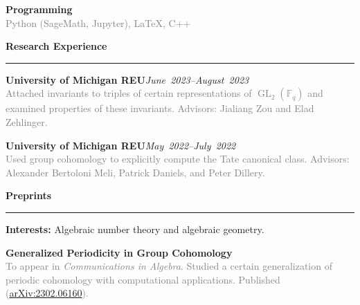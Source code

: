 \documentclass{article}
\renewcommand{\section}[1]{{\color{headercolor}\LARGE
    \textbf{#1\phantom{p}}\hrule}}
\newcommand{\entry}[5]{{\large\textbf{#1}}\hfill\textit{#3}\\
    #2\hfill\\
    \textcolor{gray}{#5}}
\newcommand{\award}[3]{{\large\textbf{#1}}\hfill\textit{#2}\\
    \textcolor{gray}{#3}}
\begin{document}
\iffalse
    \entry{MORPH}{Student}{June--Aug. 2020}{3 hours/week}
    {Worked through some of \textit{Problems in Analytic Number Theory} as directed reading, wrote over 100 pages of solutions, wrote introductory handout for the Prime Number Theorem.}
\fi

\award{Programming}{}{Python (SageMath, Jupyter), \LaTeX{}, C++}{}


\section{Research Experience}

\award{University of Michigan REU}{June~2023--August~2023}
{Attached invariants to triples of certain representations of $\operatorname{GL}_2(\mathbb F_q)$ and examined properties of these invariants. Advisors: Jialiang Zou and Elad Zehlinger.}

\award{University of Michigan REU}{May~2022--July~2022}
{Used group cohomology to explicitly compute the Tate canonical class. Advisors: Alexander Bertoloni Meli, Patrick Daniels, and Peter Dillery.}


\section{Preprints}

{\large\bfseries Interests:} {\large\color{gray}Algebraic number theory and algebraic geometry.}


\award{Generalized Periodicity in Group Cohomology}{}
{To appear in \textit{Communications in Algebra}. Studied a certain generalization of periodic cohomology with computational applications. Published (\underline{\href{https://arxiv.org/abs/2302.06160}{arXiv:2302.06160}}).}
\end{document}
